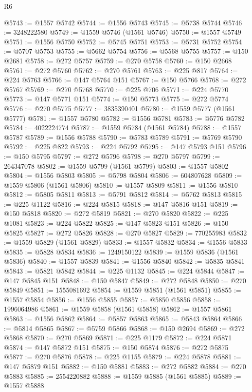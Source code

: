 \begin{lexlean}{R6}
\begin{coremodule}
@5743 := @1557 @5742
@5744 := @1556 @5743
@5745 := @5738 @5744
@5746 := 3248222580
@5749 := @1559 @5746 (@1561 @5746)
@5750 := @1557 @5749
@5751 := @1556 @5750
@5752 := @5745 @5751
@5753 := @5731 @5752
@5754 := @5707 @5753
@5755 := @5662 @5754
@5756 := @5568 @5755
@5757 := @150 @2681
@5758 := @272 @5757
@5759 := @270 @5758
@5760 := @150 @2668
@5761 := @272 @5760
@5762 := @270 @5761
@5763 := @225 @817
@5764 := @224 @5763
@5766 := @147 @5764 @151
@5767 := @150 @5766
@5768 := @272 @5767
@5769 := @270 @5768
@5770 := @225 @706
@5771 := @224 @5770
@5773 := @147 @5771 @151
@5774 := @150 @5773
@5775 := @272 @5774
@5776 := @270 @5775
@5777 := 3835390401
@5780 := @1559 @5777 (@1561 @5777)
@5781 := @1557 @5780
@5782 := @1556 @5781
@5783 := @5776 @5782
@5784 := 4022224774
@5787 := @1559 @5784 (@1561 @5784)
@5788 := @1557 @5787
@5789 := @1556 @5788
@5790 := @5783 @5789
@5791 := @5769 @5790
@5792 := @225 @822
@5793 := @224 @5792
@5795 := @147 @5793 @151
@5796 := @150 @5795
@5797 := @272 @5796
@5798 := @270 @5797
@5799 := 264347078
@5802 := @1559 @5799 (@1561 @5799)
@5803 := @1557 @5802
@5804 := @1556 @5803
@5805 := @5798 @5804
@5806 := 604807628
@5809 := @1559 @5806 (@1561 @5806)
@5810 := @1557 @5809
@5811 := @1556 @5810
@5812 := @5805 @5811
@5813 := @5791 @5812
@5814 := @5762 @5813
@5815 := @225 @1122
@5816 := @224 @5815
@5818 := @147 @5816 @151
@5819 := @150 @5818
@5820 := @272 @5819
@5821 := @270 @5820
@5822 := @225 @1081
@5823 := @224 @5822
@5825 := @147 @5823 @151
@5826 := @150 @5825
@5827 := @272 @5826
@5828 := @270 @5827
@5829 := 770255983
@5832 := @1559 @5829 (@1561 @5829)
@5833 := @1557 @5832
@5834 := @1556 @5833
@5835 := @5828 @5834
@5836 := 1249150122
@5839 := @1559 @5836 (@1561 @5836)
@5840 := @1557 @5839
@5841 := @1556 @5840
@5842 := @5835 @5841
@5843 := @5821 @5842
@5844 := @225 @1132
@5845 := @224 @5844
@5847 := @147 @5845 @151
@5848 := @150 @5847
@5849 := @272 @5848
@5850 := @270 @5849
@5851 := 1555081692
@5854 := @1559 @5851 (@1561 @5851)
@5855 := @1557 @5854
@5856 := @1556 @5855
@5857 := @5850 @5856
@5858 := 1996064986
@5861 := @1559 @5858 (@1561 @5858)
@5862 := @1557 @5861
@5863 := @1556 @5862
@5864 := @5857 @5863
@5865 := @5843 @5864
@5866 := @5814 @5865
@5867 := @5759 @5866
@5868 := @150 @2694
@5869 := @272 @5868
@5870 := @270 @5869
@5871 := @225 @1179
@5872 := @224 @5871
@5874 := @147 @5872 @151
@5875 := @150 @5874
@5876 := @272 @5875
@5877 := @270 @5876
@5878 := @225 @1155
@5879 := @224 @5878
@5881 := @147 @5879 @151
@5882 := @150 @5881
@5883 := @272 @5882
@5884 := @270 @5883
@5885 := 2554220882
@5888 := @1559 @5885 (@1561 @5885)
@5889 := @1557 @5888

\end{coremodule}
\end{lexlean}
